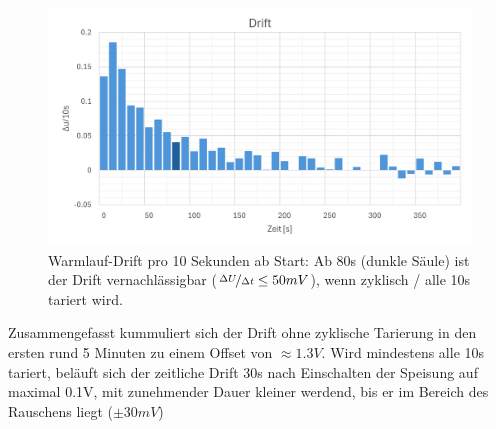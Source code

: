\documentclass[12pt,a4paper]{article}
\begin{document}
	\begin{figure}[H]
		\centering
		\includegraphics[width=1\linewidth]{Imgs/Warmlaufdrift_lose}
		\caption[Warmlauf-Drift pro 10 Sekunden ab Start]{Warmlauf-Drift pro 10 Sekunden ab Start: Ab 80s (dunkle Säule) ist der Drift vernachlässigbar ($\nicefrac{\Delta U}{\Delta t}\le 50mV$), wenn zyklisch / alle 10s tariert wird.}
		\label{fig:warmlaufdriftlose}
	\end{figure}\noindent
	Zusammengefasst kummuliert sich der Drift ohne zyklische Tarierung in den ersten rund 5 Minuten zu einem Offset von $\approx 1.3V$. Wird mindestens alle 10s tariert, beläuft sich der zeitliche Drift 30s nach Einschalten der Speisung auf maximal 0.1V, mit zunehmender Dauer kleiner werdend, bis er im Bereich des Rauschens liegt ($\pm 30 mV$)
\end{document}

